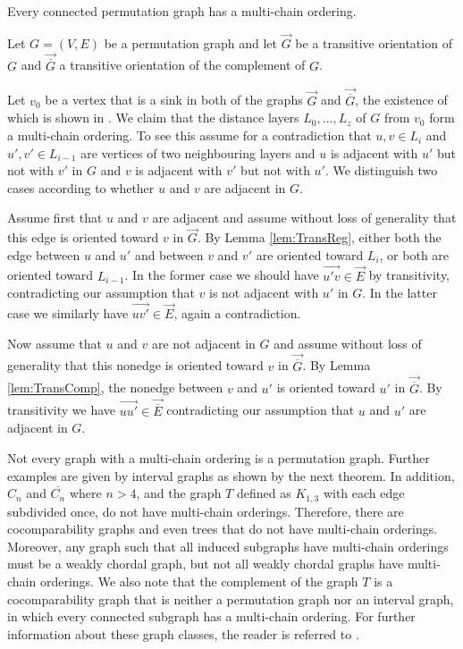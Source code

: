 \documentclass[12pt]{llncs}
\begin{document}
\begin{theorem}\label{perm}
Every connected permutation graph has a multi-chain ordering.  
\end{theorem}
\begin{my_proof}
Let $G = (V, E)$ be a permutation graph and let $\overrightarrow{G}$
be a transitive orientation of $G$ and $\overrightarrow{\overline{G}}$
a transitive orientation of the complement of $G$.

Let $v_0$ be a vertex that is a sink in both
of the graphs $\overrightarrow G$ and $\overrightarrow{\overline G}$,
the existence of which is shown in \cite{pnueli}.
We claim that the distance layers $L_0,\ldots,L_z$ of $G$ from
$v_0$ form a multi-chain ordering.  
To see this assume for a contradiction that $u, v\in L_i$
and $u',v'\in L_{i-1}$ are vertices of two neighbouring layers and
$u$ is adjacent with $u'$ but not with $v'$
in $G$ and $v$ is adjacent with $v'$ but not with $u'$.  We
distinguish two cases according to whether $u$ and $v$ are adjacent in
$G$.

Assume first that $u$ and $v$ are adjacent and assume without loss of
generality that this edge is oriented
toward $v$ in $\overrightarrow G$.
By Lemma \ref{lem:TransReg}, either both the edge between $u$ and $u'$
and between $v$ and $v'$ are oriented toward $L_i$, or both are
oriented toward $L_{i-1}$.  In the former case we should have
$\overrightarrow{u'v}\in \overrightarrow E$ by transitivity,
contradicting our assumption that $v$ is not adjacent with $u'$ in
$G$. In the latter case we similarly have $\overrightarrow
{uv'}\in\overrightarrow E$, again a contradiction.

Now assume that $u$ and $v$ are not adjacent in $G$ and assume
without loss of generality that this nonedge
is oriented toward $v$ in $\overrightarrow{\overline G}$. By
Lemma \ref{lem:TransComp}, the nonedge between $v$ and $u'$ is
oriented toward $u'$ in $\overrightarrow{\overline G}$. By
transitivity we have $\overrightarrow{uu'}\in\overrightarrow{\overline
E}$ contradicting our assumption that $u$ and $u'$ are adjacent in $G$.
\end{my_proof}

Not every graph with a multi-chain ordering is a
permutation graph. Further examples are given by interval graphs as shown by
the next theorem. 
In addition, $C_n$ and $\overline{C_n}$ where $n>4$, and the graph $T$ defined as $K_{1,3}$ with each edge subdivided once, do not have multi-chain orderings.
Therefore, there are cocomparability graphs and even trees that do not have multi-chain orderings. Moreover, any graph such that all induced subgraphs have multi-chain orderings must be a weakly chordal graph, but not all weakly chordal graphs have multi-chain orderings. We also note that the complement of the graph $T$ is a cocomparability graph that is neither a permutation graph nor an interval graph, in which every connected subgraph has a multi-chain ordering. For further information about these graph classes, the reader is referred to \cite{BLS}.
\end{document}
